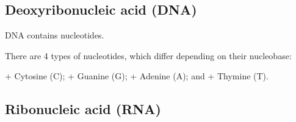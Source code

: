 
\subsection{Deoxyribonucleic acid (DNA)}

DNA contains nucleotides.

There are 4 types of nucleotides, which differ depending on their nucleobase:

+ Cytosine (C);
+ Guanine (G);
+ Adenine (A); and
+ Thymine (T).

\subsection{Ribonucleic acid (RNA)}


